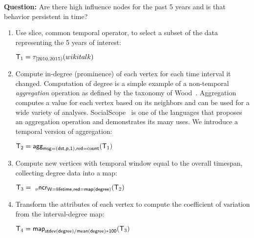 {\bf Question:} Are there high influence nodes for the past 5 years
and is that behavior persistent in time?

\begin{enumerate}[noitemsep,itemindent=\dimexpr\labelwidth+\labelsep\relax,leftmargin=0pt]
\item Use slice, common temporal operator, to select a subset of the
  data representing the 5 years of interest:

\begin{center}
\vspace{-0.2cm}
$\mathsf{T}_1 = \tau_{[2010,2015)}(wikitalk)$
\vspace{-0.2cm}
\end{center}

\item Compute in-degree (prominence) of each vertex for each time
interval it changed.  Computation of degree is a simple example of a
non-temporal {\em aggregation} operation as defined by the taxonomy of
Wood~\cite{Wood2012}.  Aggregation computes a value for each vertex
based on its neighbors and can be used for a wide variety of analyses.
SocialScope~\cite{Amer-Yahia2009} is one of the languages that proposes
an aggregation operation and demonstrates its many uses.  We introduce
a temporal version of aggregation:

\begin{center}
\vspace{-0.2cm}
$\mathsf{T}_2 = \textsf{agg}_{\mathsf{msg=(dst,p,1),red=count}}(\mathsf{T}_1)$
\vspace{-0.2cm}
\end{center}

\item Compute new vertices with temporal window equal to the overall
  timespan, collecting degree data into a map:

\begin{center}
\vspace{-0.2cm}
$\mathsf{T}_3 = ~_{v}\textsf{ncr}_{\mathsf{W=lifetime,red=map(degree)}}(\mathsf{T}_2)$
\vspace{-0.2cm}
\end{center}

\item Transform the attributes of each vertex to compute the
  coefficient of variation from the interval-degree map:

\begin{center}
\vspace{-0.2cm}
$\mathsf{T}_4 = \textsf{map}_{\mathsf{stdev(degree)/mean(degree)*100}}(\mathsf{T}_3)$
\vspace{-0.2cm}
\end{center}

\end{enumerate}

